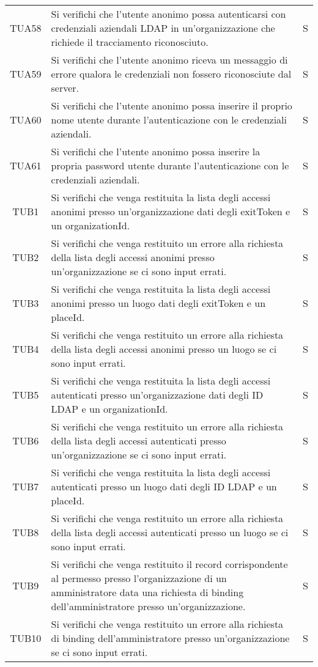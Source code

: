 {\begin{longtable}{ c C{13cm} C{1cm}}
TUA58 & Si verifichi che l’utente anonimo possa autenticarsi con credenziali aziendali LDAP in un'organizzazione che richiede il tracciamento riconosciuto. & S \\
TUA59 & Si verifichi che l’utente anonimo riceva un messaggio di errore qualora le credenziali  non fossero riconosciute dal server. & S \\
TUA60 & Si verifichi che l’utente anonimo possa inserire il proprio nome utente durante l'autenticazione con le credenziali  aziendali. & S \\
TUA61 & Si verifichi che l’utente anonimo possa inserire la propria password utente durante l'autenticazione con le credenziali  aziendali. & S \\
TUB1 & Si verifichi che venga restituita la lista degli accessi anonimi presso un'organizzazione dati degli exitToken e un organizationId. & S \\
TUB2 & Si verifichi che venga restituito un errore alla richiesta della lista degli accessi anonimi presso un'organizzazione se ci sono input errati. & S \\
TUB3 & Si verifichi che venga restituita la lista degli accessi anonimi presso un luogo dati degli exitToken e un placeId. & S \\
TUB4 & Si verifichi che venga restituito un errore alla richiesta della lista degli accessi anonimi presso un luogo se ci sono input errati. & S \\
TUB5 & Si verifichi che venga restituita la lista degli accessi autenticati presso un'organizzazione dati degli ID LDAP e un organizationId. & S \\
TUB6 & Si verifichi che venga restituito un errore alla richiesta della lista degli accessi autenticati presso un'organizzazione se ci sono input errati. & S \\
TUB7 & Si verifichi che venga restituita la lista degli accessi autenticati presso un luogo dati degli ID LDAP e un placeId. & S \\
TUB8 & Si verifichi che venga restituito un errore alla richiesta della lista degli accessi autenticati presso un luogo se ci sono input errati. & S \\
TUB9 & Si verifichi che venga restituito il record corrispondente al permesso presso l'organizzazione di un amministratore data una richiesta di binding dell'amministratore presso un'organizzazione. & S \\
TUB10 & Si verifichi che venga restituito un errore alla richiesta di binding dell'amministratore presso un'organizzazione se ci sono input errati. & S \\

\end{longtable}}
